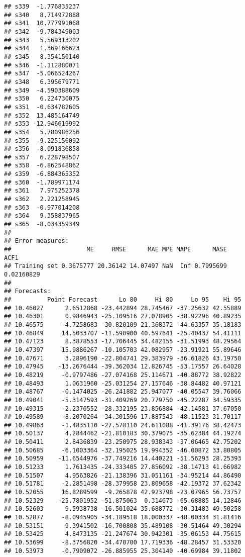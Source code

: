 \documentclass[
]{book}
\begin{document}
\begin{verbatim}
## s339  -1.776835237
## s340   8.714972888
## s341  10.777991068
## s342  -9.784349003
## s343   5.569313202
## s344   1.369166623
## s345   8.354150140
## s346  -1.112880071
## s347  -5.066524267
## s348   6.395679771
## s349  -4.590388609
## s350   6.224730075
## s351  -0.634782605
## s352  13.485164749
## s353 -12.946619992
## s354   5.780986256
## s355  -9.225156092
## s356  -8.091836858
## s357   6.228798507
## s358  -6.862548862
## s359  -6.884365352
## s360  -1.789971174
## s361   7.975252378
## s362   2.221258945
## s363  -0.977014208
## s364   9.358837965
## s365  -8.034359349
## 
## Error measures:
##                     ME     RMSE      MAE MPE MAPE      MASE       ACF1
## Training set 0.3675777 20.36142 14.07497 NaN  Inf 0.7995699 0.02160829
## 
## Forecasts:
##          Point Forecast      Lo 80     Hi 80     Lo 95    Hi 95
## 10.46027      2.6512868 -23.442894 28.745467 -37.25632 42.55889
## 10.46301      0.9846943 -25.109516 27.078905 -38.92296 40.89235
## 10.46575     -4.7258683 -30.820109 21.368372 -44.63357 35.18183
## 10.46849     14.5033707 -11.590900 40.597641 -25.40437 54.41111
## 10.47123      8.3878553 -17.706445 34.482155 -31.51993 48.29564
## 10.47397     15.9886267 -10.105703 42.082957 -23.91921 55.89646
## 10.47671      3.2896190 -22.804741 29.383979 -36.61826 43.19750
## 10.47945    -13.2676444 -39.362034 12.826745 -53.17557 26.64028
## 10.48219     -0.9797486 -27.074168 25.114671 -40.88772 38.92822
## 10.48493      1.0631960 -25.031254 27.157646 -38.84482 40.97121
## 10.48767     -0.1474025 -26.241882 25.947077 -40.05547 39.76066
## 10.49041     -5.3147593 -31.409269 20.779750 -45.22287 34.59335
## 10.49315     -2.2376552 -28.332195 23.856884 -42.14581 37.67050
## 10.49589     -8.2070264 -34.301596 17.887543 -48.11523 31.70117
## 10.49863     -1.4835110 -27.578110 24.611088 -41.39176 38.42473
## 10.50137      4.2844462 -21.810183 30.379075 -35.62384 44.19274
## 10.50411      2.8436839 -23.250975 28.938343 -37.06465 42.75202
## 10.50685     -6.1003364 -32.195025 19.994352 -46.00872 33.80805
## 10.50959    -11.6544976 -37.749216 14.440221 -51.56293 28.25393
## 10.51233      1.7613435 -24.333405 27.856092 -38.14713 41.66982
## 10.51507      4.9563826 -21.138396 31.051161 -34.95214 44.86490
## 10.51781     -2.2851498 -28.379958 23.809658 -42.19372 37.62342
## 10.52055     16.8289599  -9.265878 42.923798 -23.07965 56.73757
## 10.52329    -25.7801952 -51.875063  0.314673 -65.68885 14.12846
## 10.52603      9.5938738 -16.501024 35.688772 -30.31483 49.50258
## 10.52877     -8.0945905 -34.189518 18.000337 -48.00334 31.81416
## 10.53151      9.3941502 -16.700808 35.489108 -30.51464 49.30294
## 10.53425      4.8473135 -21.247674 30.942301 -35.06153 44.75615
## 10.53699     -8.3756820 -34.470700 17.719336 -48.28457 31.53320
## 10.53973     -0.7909072 -26.885955 25.304140 -40.69984 39.11802
\end{verbatim}
\end{document}
